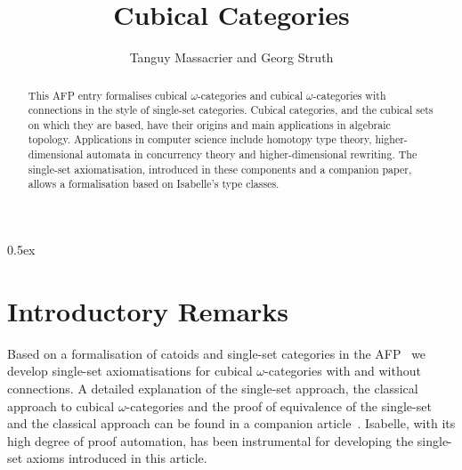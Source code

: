 \documentclass[11pt,a4paper]{article}
\begin{document}
\title{Cubical Categories}
\author{Tanguy Massacrier and Georg Struth}
\maketitle

\begin{abstract}
  This AFP entry formalises cubical $\omega$-categories and cubical
  $\omega$-cate\-gories with connections in the style of single-set
  categories. Cubical categories, and the cubical sets on which they
  are based, have their origins and main applications in algebraic
  topology. Applications in computer science include homotopy type
  theory, higher-dimensional automata in concurrency theory and
  higher-dimensional rewriting. The single-set axiomatisation,
  introduced in these components and a companion paper, allows a
  formalisation based on Isabelle's type classes.
\end{abstract}

\tableofcontents

\parindent 0pt\parskip 0.5ex

\section{Introductory Remarks}

Based on a formalisation of catoids and single-set categories in the
AFP~\cite{Struth23} we develop single-set axiomatisations for cubical
$\omega$-categories with and without connections. A detailed
explanation of the single-set approach, the classical approach to
cubical $\omega$-categories and the proof of equivalence of the
single-set and the classical approach can be found in a companion
article~\cite{MalbosMS24}.  Isabelle, with its high degree of proof
automation, has been instrumental for developing the single-set
axioms introduced in this article.





\end{document}
